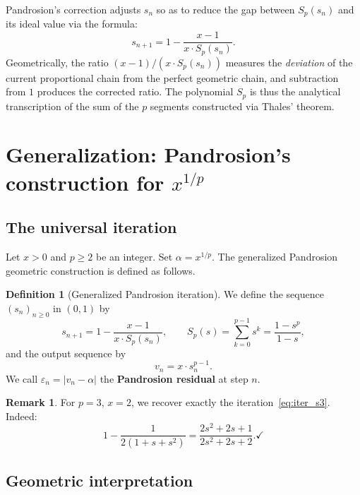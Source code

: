 \documentclass[11pt,a4paper]{article}
\theoremstyle{definition}
\newtheorem{definition}{Definition}[section]
\newtheorem{remark}{Remark}[section]
\newcommand{\eps}{\varepsilon}
\begin{document}
Pandrosion's correction adjusts $s_n$ so as to reduce the gap between $S_p(s_n)$ and its ideal value via the formula:
\[
  s_{n+1} = 1 - \frac{x-1}{x \cdot S_p(s_n)}.
\]
Geometrically, the ratio $(x-1)/(x \cdot S_p(s_n))$ measures the \emph{deviation} of the current proportional chain from the perfect geometric chain, and subtraction from $1$ produces the corrected ratio. The polynomial $S_p$ is thus the analytical transcription of the sum of the $p$ segments constructed via Thales' theorem.

\section{Generalization: Pandrosion's construction for \texorpdfstring{$x^{1/p}$}{x\^{}(1/p)}}
\label{sec:generalisation}

\subsection{The universal iteration}

Let $x > 0$ and $p \geq 2$ be an integer. Set $\alpha = x^{1/p}$. The generalized Pandrosion geometric construction is defined as follows.

\begin{definition}[Generalized Pandrosion iteration]
\label{def:pandrosion_gen}
We define the sequence $(s_n)_{n \geq 0}$ in $(0, 1)$ by
\begin{equation}
  \label{eq:pandrosion_gen}
  s_{n+1} = 1 - \frac{x - 1}{x \cdot S_p(s_n)},
  \qquad
  S_p(s) = \sum_{k=0}^{p-1} s^k = \frac{1 - s^p}{1 - s},
\end{equation}
and the output sequence by
\begin{equation}
  \label{eq:vn_gen}
  v_n = x \cdot s_n^{p-1}.
\end{equation}
We call $\eps_n = |v_n - \alpha|$ the \textbf{Pandrosion residual} at step $n$.
\end{definition}

\begin{remark}
For $p = 3$, $x = 2$, we recover exactly the iteration~\eqref{eq:iter_s3}. Indeed:
\[
  1 - \frac{1}{2(1+s+s^2)} = \frac{2s^2+2s+1}{2s^2+2s+2}. \checkmark
\]
\end{remark}

\subsection{Geometric interpretation}
\end{document}
